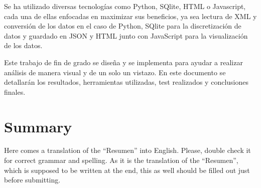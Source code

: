 \documentclass[a4paper, 12pt]{book}
\begin{document}
Se ha utilizado diversas tecnologías como Python, SQlite, HTML o Javascript, cada una de ellas enfocadas en maximizar sus beneficios, ya sea lectura de XML y conversión de los datos en el caso de Python, SQlite para la discretización de datos y guardado en JSON y HTML junto con JavaScript para la visualización de los datos.

Este trabajo de fin de grado se diseña y se implementa para ayudar a realizar análisis de manera visual y de un solo un vistazo. En este documento se detallarán los resultados, herramientas utilizadas, test realizados y conclusiones finales.





\chapter*{Summary}

Here comes a translation of the ``Resumen'' into English. 
Please, double check it for correct grammar and spelling.
As it is the translation of the ``Resumen'', which is supposed to be written at the end, this as well should be filled out just before submitting.




\tableofcontents 
\cleardoublepage
\listoffigures %


\end{document}
